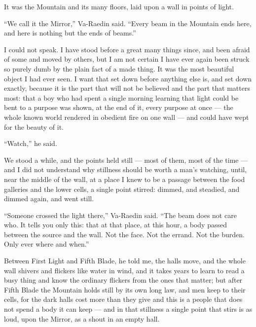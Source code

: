 It was the Mountain and its many floors, laid upon a wall in points of light.\par

``We call it the Mirror,'' Va-Raedin said. 
``Every beam in the Mountain ends here, and here is nothing but the ends of beams.''\par

I could not speak. 
I have stood before a great many things since, and been afraid of some and moved by others, but I am not certain I have ever again been struck so 
purely dumb by the plain fact of a made thing. 
It was the most beautiful object I had ever seen. 
I want that set down before anything else is, and set down exactly, because it is the part that will not be believed and the part that matters most: 
that a boy who had spent a single morning learning that light could be bent to a purpose was shown, at the end of it, every purpose at once --- 
the whole known world rendered in obedient fire on one wall --- and could have wept for the beauty of it.\par

``Watch,'' he said.\par

We stood a while, and the points held still --- most of them, most of the time --- and I did not understand why stillness should be worth a man's watching, until, 
near the middle of the wall, at a place I knew to be a passage between the food galleries and the lower cells, a single point stirred: 
dimmed, and steadied, and dimmed again, and went still.\par

``Someone crossed the light there,'' Va-Raedin said. 
``The beam does not care who. It tells you only this: that at that place, at this hour, a body passed between the source and the wall. Not the face. 
Not the errand. Not the burden. Only ever where and when.''\par

Between First Light and Fifth Blade, he told me, the halls move, and the whole wall shivers and flickers like water in wind, and it takes years to learn to read a 
busy thing and know the ordinary flickers from the ones that matter; 
but after Fifth Blade the Mountain holds still by its own long law, and men keep to their cells, for the dark halls cost more than they give and this is a people 
that does not spend a body it can keep --- and in that stillness a single point that stirs is as loud, upon the Mirror, as a shout in an empty hall.\par

